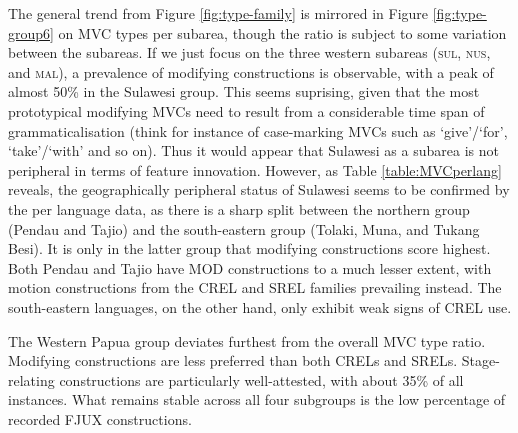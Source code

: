The general trend from Figure \ref{fig:type-family} is mirrored in Figure \ref{fig:type-group6} on MVC types per subarea, though the ratio is subject to some variation between the subareas. If we just focus on the three western subareas (\textsc{sul}, \textsc{nus}, and \textsc{mal}), a prevalence of modifying constructions is observable, with a peak of almost 50\% in the Sulawesi group. This seems suprising, given that the most prototypical modifying MVCs need to result from a considerable time span of grammaticalisation (think for instance of case-marking MVCs such as `give'/`for', `take'/`with' and so on). Thus it would appear that Sulawesi as a subarea is not peripheral in terms of feature innovation. However, as Table \ref{table:MVCperlang} reveals, the geographically peripheral status of Sulawesi seems to be confirmed by the per language data, as there is a sharp split between the northern group (Pendau and Tajio) and the south-eastern group (Tolaki, Muna, and Tukang Besi). It is only in the latter group that modifying constructions score highest. Both Pendau and Tajio have MOD constructions to a much lesser extent, with motion constructions from the CREL and SREL families prevailing instead. The south-eastern languages, on the other hand, only exhibit weak signs of CREL use.

The Western Papua group deviates furthest from the overall MVC type ratio. Modifying constructions are less preferred than both CRELs and SRELs. Stage-relating constructions are particularly well-attested, with about 35\% of all instances. What remains stable across all four subgroups is the low percentage of recorded FJUX constructions.

